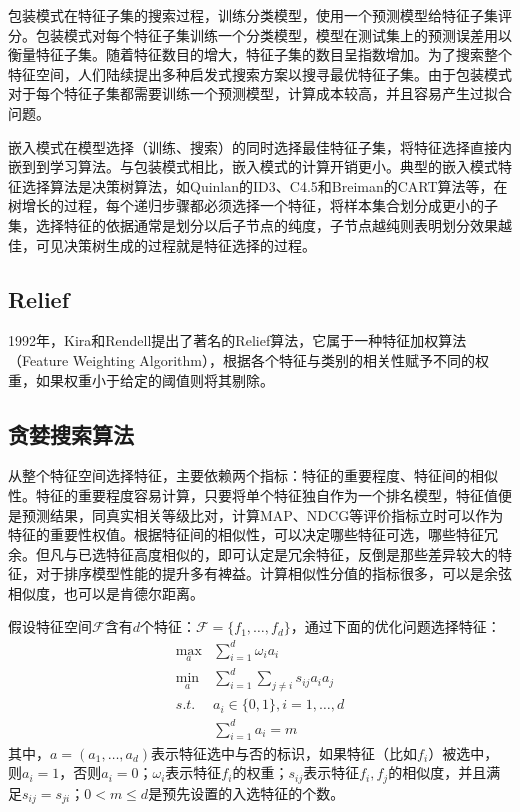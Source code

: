 包装模式在特征子集的搜索过程，训练分类模型，使用一个预测模型给特征子集评分。包装模式对每个特征子集训练一个分类模型，模型在测试集上的预测误差用以衡量特征子集。随着特征数目的增大，特征子集的数目呈指数增加。为了搜索整个特征空间，人们陆续提出多种启发式搜索方案以搜寻最优特征子集。由于包装模式对于每个特征子集都需要训练一个预测模型，计算成本较高，并且容易产生过拟合问题。

嵌入模式在模型选择（训练、搜索）的同时选择最佳特征子集，将特征选择直接内嵌到到学习算法。与包装模式相比，嵌入模式的计算开销更小。典型的嵌入模式特征选择算法是决策树算法，如Quinlan的ID3、C4.5\cite{quinlan1986induction,quinlan1993c4}和Breiman的CART算法\cite{breiman1993classification}等，在树增长的过程，每个递归步骤都必须选择一个特征，将样本集合划分成更小的子集，选择特征的依据通常是划分以后子节点的纯度，子节点越纯则表明划分效果越佳，可见决策树生成的过程就是特征选择的过程。

\subsection{Relief}
1992年，Kira和Rendell提出了著名的Relief算法\cite{kira1992practical}，它属于一种特征加权算法（Feature Weighting Algorithm），根据各个特征与类别的相关性赋予不同的权重，如果权重小于给定的阈值则将其剔除。

\subsection{贪婪搜索算法}
从整个特征空间选择特征，主要依赖两个指标：特征的重要程度、特征间的相似性。特征的重要程度容易计算，只要将单个特征独自作为一个排名模型，特征值便是预测结果，同真实相关等级比对，计算MAP、NDCG等评价指标立时可以作为特征的重要性权值。根据特征间的相似性，可以决定哪些特征可选，哪些特征冗余。但凡与已选特征高度相似的，即可认定是冗余特征，反倒是那些差异较大的特征，对于排序模型性能的提升多有裨益。计算相似性分值的指标很多，可以是余弦相似度，也可以是肯德尔距离。

假设特征空间$\mathcal F$含有$d$个特征：$\mathcal F = \{f_1, \ldots, f_d\}$，\cite{geng2007feature}通过下面的优化问题选择特征：
\begin{equation}\label{eq:mfeatureselect}
    \begin{array}{ll}
      \max\limits_a & \sum\limits_{i = 1}^d \omega_i a_i\\
      \min\limits_a & \sum\limits_{i = 1}^d \sum\limits_{j \ne i} s_{ij} a_i a_j\\
      \textit{s.t.} & a_i\in \{0, 1\}, i = 1,\ldots, d\\
      & \sum\limits_{i=1}^d a_i= m
    \end{array}
\end{equation}
其中，$a = (a_1,\ldots,a_d)$表示特征选中与否的标识，如果特征（比如$f_i$）被选中，则$a_i = 1$，否则$a_i = 0$；$\omega_i$表示特征$f_i$的权重；$s_{ij}$表示特征$f_i, f_j$的相似度，并且满足$s_{ij} = s_{ji}$；$0 < m \le d$是预先设置的入选特征的个数。

